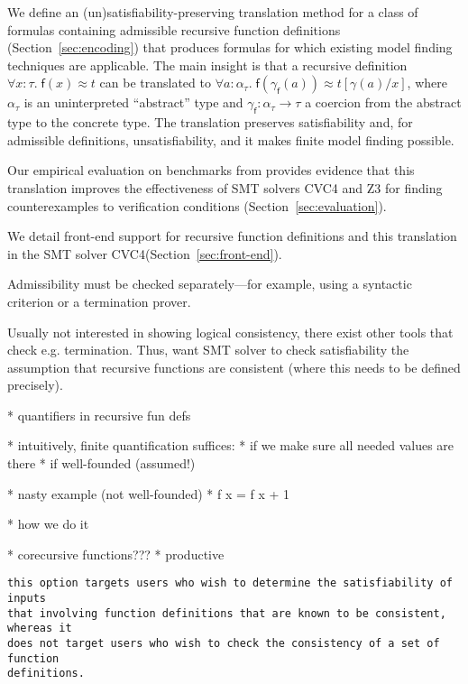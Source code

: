 \documentclass[runningheads,a4paper]{llncs}
\newcommand{\con}[1]{\mathsf{#1}}
\let\const=\con
\newcommand\cvc{CVC4\xspace}
\newcommand\ziii{Z3\xspace}
\newcommand{\teq}{\approx}
\newcommand\concret{\gamma} %
\newcommand{\farg}[1]{\concret_{#1}}
\newcommand{\fargsort}[1]{\alpha_{#1}}
\begin{document}
We define an (un)satisfiability-preserving translation method for a class of
formulas containing admissible recursive function definitions
(Section~\ref{sec:encoding}) that produces formulas for which existing model
finding techniques are applicable. The main insight is that a
recursive definition $\forall x : \tau.\; \const{f}(x) \teq t$
can be translated to
$\forall a :
\fargsort{\tau}.\; \const{f}(\farg{\con{f}}(a)) \teq t[\concret(a)/x]$, where
$\fargsort{\tau}$ is an uninterpreted ``abstract'' type and $\farg{\con{f}} :
\fargsort{\tau} \to \tau$ a coercion from the abstract type to the concrete
type. The translation preserves satisfiability and, for admissible definitions,
unsatisfiability, and it makes finite model finding possible.

Our empirical evaluation on benchmarks from provides evidence that this translation improves the
effectiveness of SMT solvers \cvc and \ziii for finding counterexamples to
verification conditions (Section~\ref{sec:evaluation}).

We detail front-end support for recursive function definitions and this
translation in the SMT solver \cvc (Section~\ref{sec:front-end}).


Admissibility must be checked separately---for example, using a
syntactic criterion or a termination prover.

Usually not interested in showing logical consistency, there
exist other tools that check e.g. termination.
Thus, want SMT solver to check satisfiability the assumption that recursive
functions are consistent (where this needs to be defined precisely).

\newpage

  * quantifiers in recursive fun defs

  * intuitively, finite quantification suffices:
    * if we make sure all needed values are there
    * if well-founded (assumed!)

  * nasty example (not well-founded)
    * f x = f x + 1

  * how we do it

  * corecursive functions???
    * productive

\begin{verbatim}
this option targets users who wish to determine the satisfiability of inputs
that involving function definitions that are known to be consistent, whereas it
does not target users who wish to check the consistency of a set of function
definitions.
\end{verbatim}
\end{document}
